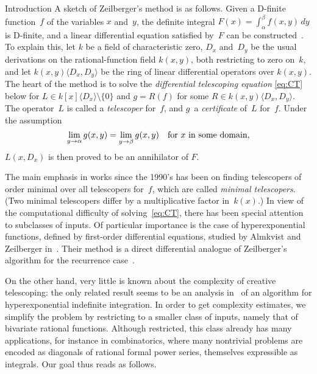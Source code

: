 \documentclass{sig-alt-full}
\begin{document}
\begin{section}{Introduction}
A sketch of Zeilberger's method is as follows.
Given a D-finite function~$f$ of the variables
$x$ and~$y$, the definite integral
$ F(x)= \int_\alpha^\beta f(x, y)\,dy$
is D-finite, and a linear differential equation satisfied by~$F$ can
be constructed~\cite{Zeilberger1990}.
To explain this, let $k$ be
a field of characteristic zero, $D_x$ and~$D_y$ be the usual
derivations on the rational-function field $k(x, y)$,
both restricting to zero on~$k$,
and let $k(x, y)\langle D_x, D_y \rangle$ be the ring of linear differential
operators over $k(x, y)$.
The heart of the method is to solve the
\emph{differential telescoping equation}
\eqref{eq:CT} below
for $L\in k[x]\langle D_x \rangle\setminus \{0\}$ and $g=R(f)$ for
some $R\in k(x, y)\langle D_x, D_y\rangle$.
The operator~$L$ is called a
\emph{telescoper\/} for~$f$, and $g$~a \emph{certificate\/} of~$L$ for~$f$.
Under the assumption
\begin{equation*}
\lim_{y\rightarrow\alpha}g(x,y)=\lim_{y\rightarrow\beta}g(x,y)
\quad\text{for $x$ in some domain},
\vspace{-0.1cm}
\end{equation*}
$L(x, D_x)$ is then proved to be an annihilator of $F$.

The main emphasis in works since the 1990's has been on finding
telescopers of order minimal over all telescopers for~$f$, which are
called \emph{minimal telescopers}.
(Two minimal telescopers differ by a multiplicative factor in~$k(x)$.)
In view of the computational
difficulty of solving~\eqref{eq:CT}, there has been special
attention to subclasses of inputs. Of particular importance is the
case of hyperexponential functions, defined by first-order
differential equations, studied by Almkvist and Zeilberger
in~\cite{Almkvist1990}. Their method is a direct differential
analogue of Zeilberger's algorithm for the recurrence
case~\cite{Zeilberger1991}.

On the other hand, very little is known about the complexity of
creative telescoping: the only related result seems to be an
analysis in~\cite{Gerhard2004} of an algorithm for hyperexponential
indefinite integration.
In order to get complexity estimates, we simplify the
problem by restricting to a smaller class of inputs, namely that of
bivariate rational functions.
Although restricted, this class already has many applications,
for instance in combinatorics,
where many nontrivial problems are encoded as diagonals of rational
formal power series, themselves expressible as integrals.
Our goal thus reads as follows.


\end{section}
\end{document}
